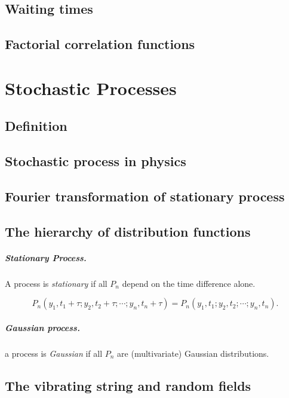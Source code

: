 \documentclass{book}
\numberwithin{equation}{section}
\theoremstyle{plain}
\theoremstyle{definition}
\theoremstyle{remark}
\theoremstyle{BoldStyle}
\numberwithin{exercise}{section}
\begin{document}
\section{Waiting times}

\section{Factorial correlation functions}


\chapter{Stochastic Processes}

\section{Definition}

\section{Stochastic process in physics}

\section{Fourier transformation of stationary process}

\section{The hierarchy of distribution functions}

\paragraph{Stationary Process.}

A process is \emph{stationary} if all $P_n$ depend on the time difference alone.

$$
P_n(y_1, t_1 + \tau; y_2, t_2 + \tau; \cdots; y_n, t_n + \tau)
=
P_n(y_1, t_1; y_2, t_2; \cdots; y_n, t_n).
$$


\paragraph{Gaussian process.}

a process is \emph{Gaussian} if all $P_n$ are
(multivariate) Gaussian distributions.


\section{The vibrating string and random fields}
\end{document}
